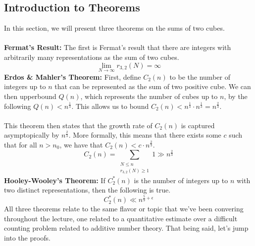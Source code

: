 \subsection{Introduction to Theorems}
In this section, we will present three theorems on the sums of two cubes. \\
\\
\textbf{Fermat's Result:} The first is Fermat's result that there are integers with arbitrarily many representations as the sum of two cubes.
$$
\lim_{N\rightarrow\infty} r_{3,2}(N) = \infty
$$
\textbf{Erdos \& Mahler's Theorem:} First, define $C_2(n)$ to be the number of integers up to $n$ that can be represented as the sum of two positive cube. We can then upperbound $Q(n)$, which represents the number of cubes up to $n$, by the following $Q(n) < n^{\frac{1}{3}}$. This allows us to bound $C_2(n) < n^{\frac{1}{3}} \cdot n^{\frac{1}{3}} = n^{\frac{2}{3}}$. \\
\\
This theorem then states that the growth rate of $C_2(n)$ is captured asymptopically by $n^{\frac{2}{3}}$. More formally, this means that there exists some $c$ such that for all $n > n_0$, we have that $C_2(n) < c \cdot n^{\frac{2}{3}}$.
$$
C_2(n) = \sum_{\substack{N \leq n \\ r_{3,2}(N) \geq 1}} 1 \gg n^{\frac{2}{3}}
$$
\textbf{Hooley-Wooley's Theorem:} If $C^*_2(n)$ is the number of integers up to $n$ with two distinct representations, then the following is true.
$$
C^*_2(n) \ll n^{\frac{5}{9} + \epsilon}
$$
All three theorems relate to the same flavor or topic that we've been convering throughout the lecture, one related to a quantitative estimate over a difficult counting problem related to additive number theory. That being said, let's jump into the proofs.

